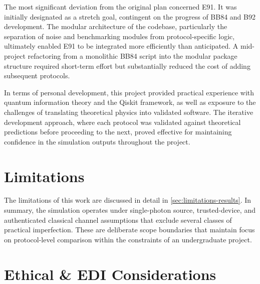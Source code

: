 \documentclass[10pt, a4paper]{report}
\begin{document}
The most significant deviation from the original plan concerned E91. It was initially designated as a stretch goal, contingent on the progress of BB84 and B92 development. The modular architecture of the codebase, particularly the separation of noise and benchmarking modules from protocol-specific logic, ultimately enabled E91 to be integrated more efficiently than anticipated. A mid-project refactoring from a monolithic BB84 script into the modular package structure required short-term effort but substantially reduced the cost of adding subsequent protocols.

In terms of personal development, this project provided practical experience with quantum information theory and the Qiskit framework, as well as exposure to the challenges of translating theoretical physics into validated software. The iterative development approach, where each protocol was validated against theoretical predictions before proceeding to the next, proved effective for maintaining confidence in the simulation outputs throughout the project.



\section{Limitations}

The limitations of this work are discussed in detail in \cref{sec:limitations-results}. In summary, the simulation operates under single-photon source, trusted-device, and authenticated classical channel assumptions that exclude several classes of practical imperfection. These are deliberate scope boundaries that maintain focus on protocol-level comparison within the constraints of an undergraduate project.




\section{Ethical \& EDI Considerations}
\end{document}
